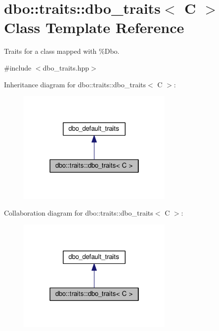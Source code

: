 \hypertarget{structdbo_1_1traits_1_1dbo__traits}{\section{dbo\+:\+:traits\+:\+:dbo\+\_\+traits$<$ C $>$ Class Template Reference}
\label{structdbo_1_1traits_1_1dbo__traits}
}


Traits for a class mapped with \%Dbo.  




{\ttfamily \#include $<$dbo\+\_\+traits.\+hpp$>$}



Inheritance diagram for dbo\+:\+:traits\+:\+:dbo\+\_\+traits$<$ C $>$\+:\nopagebreak
\begin{figure}[H]
\begin{center}
\leavevmode
\includegraphics[width=214pt]{structdbo_1_1traits_1_1dbo__traits__inherit__graph}
\end{center}
\end{figure}


Collaboration diagram for dbo\+:\+:traits\+:\+:dbo\+\_\+traits$<$ C $>$\+:\nopagebreak
\begin{figure}[H]
\begin{center}
\leavevmode
\includegraphics[width=214pt]{structdbo_1_1traits_1_1dbo__traits__coll__graph}
\end{center}
\end{figure}

